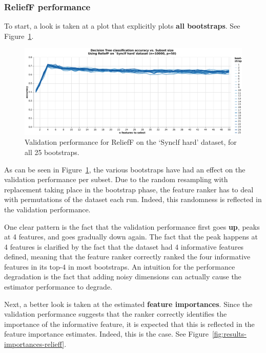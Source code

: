 \documentclass[../main.tex]{subfiles}
\begin{document}
\subsubsection{ReliefF performance}

To start, a look is taken at a plot that explicitly plots \textbf{all bootstraps}. See Figure~\ref{fig:results-validation-dt-relieff}.

\begin{figure}[ht]
    \centering
    \includegraphics[width=\linewidth]{report/images/results-validation-dt-relieff.pdf}
    \caption{Validation performance for ReliefF on the `Synclf hard' dataset, for all 25 bootstraps.}
    \label{fig:results-validation-dt-relieff}
\end{figure}

As can be seen in Figure~\ref{fig:results-validation-dt-relieff}, the various bootstraps have had an effect on the validation performance per subset. Due to the random resampling with replacement taking place in the bootstrap phase, the feature ranker has to deal with permutations of the dataset each run. Indeed, this randomness is reflected in the validation performance.

One clear pattern is the fact that the validation performance first goes \textbf{up}, peaks at 4 features, and goes gradually down again. The fact that the peak happens at 4 features is clarified by the fact that the dataset had 4 informative features defined, meaning that the feature ranker correctly ranked the four informative features in its top-4 in most bootstraps. An intuition for the performance degradation is the fact that adding noisy dimensions can actually cause the estimator performance to degrade.



Next, a better look is taken at the estimated \textbf{feature importances}. Since the validation performance suggests that the ranker correctly identifies the importance of the informative feature, it is expected that this is reflected in the feature importance estimates. Indeed, this is the case. See Figure~\ref{fig:results-importances-relieff}.
\end{document}
